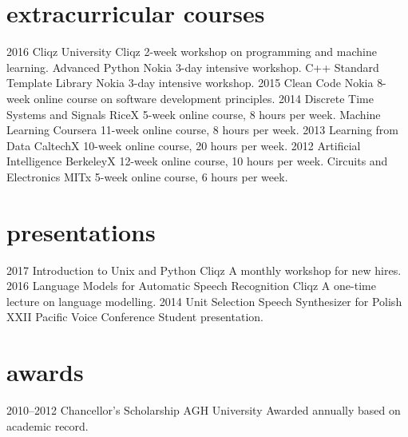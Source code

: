 \documentclass[]{friggeri-cv_osx}
\begin{document}
\section{extracurricular courses}
\begin{entrylist}
\entry
{2016}
{Cliqz University}
{Cliqz}
{2-week workshop on programming and machine learning.}
\entry
{}
{Advanced Python}
{Nokia}
{3-day intensive workshop.}
\entry
{}
{C++ Standard Template Library}
{Nokia}
{3-day intensive workshop.}
\entry
{2015}
{Clean Code}
{Nokia}
{8-week online course on software development principles.}
\entry
{2014}
{Discrete Time Systems and Signals}
{RiceX}
{5-week online course, 8 hours per week.}
\entry
{}
{Machine Learning}
{Coursera}
{11-week online course, 8 hours per week.}
\entry
{2013}
{Learning from Data}
{CaltechX}
{10-week online course, 20 hours per week.}
\entry
{2012}
{Artificial Intelligence}
{BerkeleyX}
{12-week online course, 10 hours per week.}
\entry
{}
{Circuits and Electronics}
{MITx}
{5-week online course, 6 hours per week.}
\end{entrylist}


\section{presentations}
\begin{entrylist}
\entry
{2017}
{Introduction to Unix and Python}
{Cliqz}
{A monthly workshop for new hires.}
\entry
{2016}
{Language Models for Automatic Speech Recognition}
{Cliqz}
{A one-time lecture on language modelling.}
\entry
{2014}
{Unit Selection Speech Synthesizer for Polish}
{XXII Pacific Voice Conference}
{Student presentation.}
\end{entrylist}


\section{awards}
\begin{entrylist}
\entry
{2010--2012}
{Chancellor's Scholarship}
{AGH University}
{Awarded annually based on academic record.}
\end{entrylist}
\end{document}
